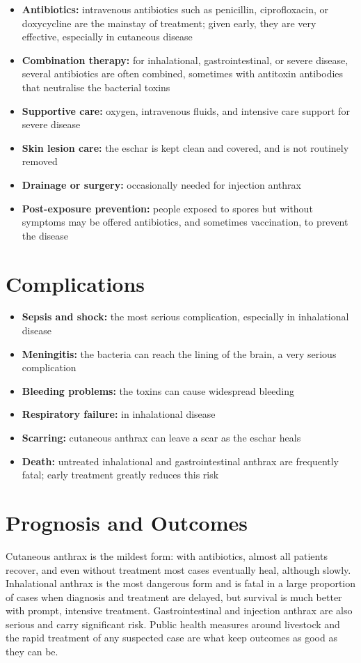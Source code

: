 \begin{itemize}
    \item \textbf{Antibiotics:} intravenous antibiotics such as penicillin, ciprofloxacin, or doxycycline are the mainstay of treatment; given early, they are very effective, especially in cutaneous disease
    \item \textbf{Combination therapy:} for inhalational, gastrointestinal, or severe disease, several antibiotics are often combined, sometimes with antitoxin antibodies that neutralise the bacterial toxins
    \item \textbf{Supportive care:} oxygen, intravenous fluids, and intensive care support for severe disease
    \item \textbf{Skin lesion care:} the eschar is kept clean and covered, and is not routinely removed
    \item \textbf{Drainage or surgery:} occasionally needed for injection anthrax
    \item \textbf{Post-exposure prevention:} people exposed to spores but without symptoms may be offered antibiotics, and sometimes vaccination, to prevent the disease
\end{itemize}

\section*{Complications}
\begin{itemize}
    \item \textbf{Sepsis and shock:} the most serious complication, especially in inhalational disease
    \item \textbf{Meningitis:} the bacteria can reach the lining of the brain, a very serious complication
    \item \textbf{Bleeding problems:} the toxins can cause widespread bleeding
    \item \textbf{Respiratory failure:} in inhalational disease
    \item \textbf{Scarring:} cutaneous anthrax can leave a scar as the eschar heals
    \item \textbf{Death:} untreated inhalational and gastrointestinal anthrax are frequently fatal; early treatment greatly reduces this risk
\end{itemize}

\section*{Prognosis and Outcomes}
Cutaneous anthrax is the mildest form: with antibiotics, almost all patients recover, and even without treatment most cases eventually heal, although slowly. Inhalational anthrax is the most dangerous form and is fatal in a large proportion of cases when diagnosis and treatment are delayed, but survival is much better with prompt, intensive treatment. Gastrointestinal and injection anthrax are also serious and carry significant risk. Public health measures around livestock and the rapid treatment of any suspected case are what keep outcomes as good as they can be.

